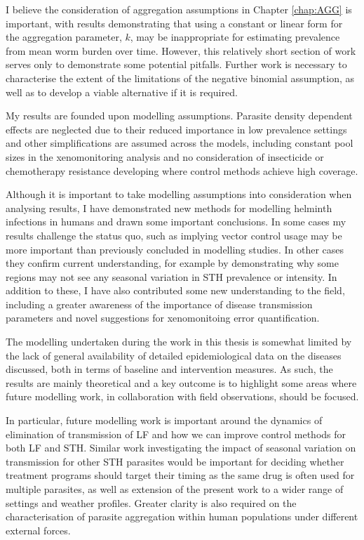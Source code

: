 I believe the consideration of aggregation assumptions in Chapter \ref{chap:AGG} is important, with results demonstrating that using a constant or linear form for the aggregation parameter, $k$, may be inappropriate for estimating prevalence from mean worm burden over time. However, this relatively short section of work serves only to demonstrate some potential pitfalls. Further work is necessary to characterise the extent of the limitations of the negative binomial assumption, as well as to develop a viable alternative if it is required.

My results are founded upon modelling assumptions. Parasite density dependent effects are neglected due to their reduced importance in low prevalence settings and other simplifications are assumed across the models, including constant pool sizes in the xenomonitoring analysis and no consideration of insecticide or chemotherapy resistance developing where control methods achieve high coverage.

Although it is important to take modelling assumptions into consideration when analysing results, I have demonstrated new methods for modelling helminth infections in humans and drawn some important conclusions. In some cases my results challenge the status quo, such as implying vector control usage may be more important than previously concluded in modelling studies. In other cases they confirm current understanding, for example by demonstrating why some regions may not see any seasonal variation in STH prevalence or intensity. In addition to these, I have also contributed some new understanding to the field, including a greater awareness of the importance of disease transmission parameters and novel suggestions for xenomonitoing error quantification.

The modelling undertaken during the work in this thesis is somewhat limited by the lack of general availability of detailed epidemiological data on the diseases discussed, both in terms of baseline and intervention measures. As such, the results are mainly theoretical and a key outcome is to highlight some areas where future modelling work, in collaboration with field observations, should be focused.

In particular, future modelling work is important around the dynamics of elimination of transmission of LF and how we can improve control methods for both LF and STH. Similar work investigating the impact of seasonal variation on transmission for other STH parasites would be important for deciding whether treatment programs should target their timing as the same drug is often used for multiple parasites, as well as extension of the present work to a wider range of settings and weather profiles. Greater clarity is also required on the characterisation of parasite aggregation within human populations under different external forces.

